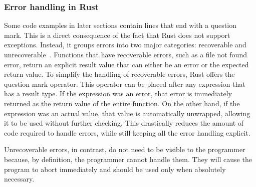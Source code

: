 \subsubsection{Error handling in Rust} \label{error-handling}


Some code examples in later sections contain lines that end with a question mark.
This is a direct consequence of the fact that Rust does not support exceptions.
Instead, it groups errors into two major categories: recoverable and unrecoverable~\cite[Chapter~9]{klabnik2019rust}.
Functions that have recoverable errors, such as a file not found error, return an explicit result value that can either be an error or the expected return value.
To simplify the handling of recoverable errors, Rust offers the question mark operator.
This operator can be placed after any expression that has a result type.
If the expression was an error, that error is immediately returned as the return value of the entire function.
On the other hand, if the expression was an actual value, that value is automatically unwrapped, allowing it to be used without further checking.
This drastically reduces the amount of code required to handle errors, while still keeping all the error handling explicit.

Unrecoverable errors, in contrast, do not need to be visible to the programmer because, by definition, the programmer cannot handle them.
They will cause the program to abort immediately and should be used only when absolutely necessary.


